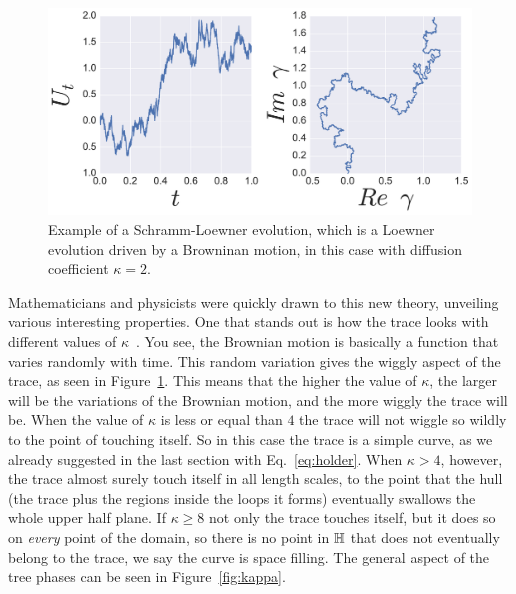 \begin{figure}[b]
\begin{center}
    \includegraphics[width=\textwidth]{chapters/ch4-sle/figs/sleexample}
\end{center}
\caption{Example of a Schramm-Loewner evolution, which is a Loewner evolution
    driven by a Browninan motion, in this case with diffusion coefficient
    $\kappa=2$.}
\label{fig:sleexample}
\end{figure}


Mathematicians and physicists were quickly drawn to this new theory, unveiling
various interesting properties. One that stands out is how the trace looks with
different values of $\kappa$~\cite{Rohde2011}. You see, the Brownian motion is
basically a function that varies randomly with time. This random variation
gives the wiggly aspect of the trace, as seen in Figure~\ref{fig:sleexample}.
This means that the higher the value of $\kappa$, the larger will be the
variations of the Brownian motion, and the more wiggly the trace will be. When
the value of $\kappa$ is less or equal than $4$ the trace will not wiggle so
wildly to the point of touching itself. So in this case the trace is a simple
curve, as we already suggested in the last section with Eq.~\ref{eq:holder}.
When $\kappa>4$, however, the trace almost surely touch itself in all length
scales, to the point that the hull (the trace plus the regions inside the loops
it forms) eventually swallows the whole upper half plane. If $\kappa\geq8$ not
only the trace touches itself, but it does so on \textit{every} point of the
domain, so there is no point in $\mathbb{H}$ that does not eventually belong to the
trace, we say the curve is space filling. The general aspect of the tree phases
can be seen in Figure~\ref{fig:kappa}.

